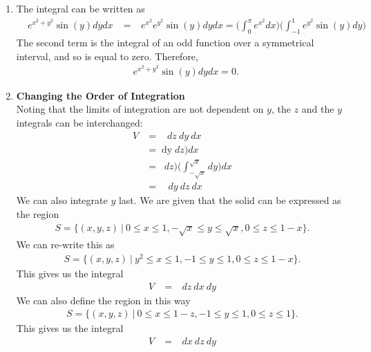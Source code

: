 \documentclass{article}
\begin{document}
\begin{enumerate}
\item %
The integral can be written as
\begin{align*}
  \mathop{\int_0^{\pi} \!\! \int_{-1}^1} e^{x^2 + y^2}\sin(y) dydx 
  &= \mathop{\int_0^{\pi} \!\! \int_{-1}^1} e^{x^2}e^{y^2}\sin(y) dydx  = \Bigg( \int_0^{\pi} e^{x^2} dx \Bigg)\Bigg( \int_{-1}^1 e^{y^2}\sin(y)dy \Bigg)  
\end{align*}
The second term is the integral of an odd function over a symmetrical interval, and so is equal to zero. Therefore,
\begin{align*}
  \mathop{\int_0^{\pi} \!\! \int_{-1}^1} e^{x^2 + y^2}\sin(y) dydx =0.
\end{align*}


\item %
\textbf{Changing the Order of Integration}\\
Noting that the limits of integration are not dependent on $y$, the $z$ and the $y$ integrals can be interchanged:
\begin{align*}
  V &= \mathop{\int_{0}^{1} \!\! \int_{-\sqrt{x}}^{\sqrt{x}} \! \int_0^{1-x} } dz\ dy\ dx \\
   &= \mathop{\int_{0}^{1} \Bigg( \int_{-\sqrt{x}}^{\sqrt{x}} dy \Bigg) \Bigg( \int_0^{1-x} } dz\Bigg) dx \\
   &= \mathop{\int_{0}^{1}  \Bigg( \int_0^{1-x} } dz\Bigg) \Bigg( \int_{-\sqrt{x}}^{\sqrt{x}} dy \Bigg)dx \\
   &= \mathop{\int_{0}^{1} \!\! \int_0^{1-x} \!\! \int_{-\sqrt{x}}^{\sqrt{x}}} dy\ dz\ dx 
\end{align*}
We can also integrate $y$ last. We are given that the solid can be expressed as the region 
\begin{align*}
  S = \{(x,y,z)\ |\  0 \le x \le 1, -\sqrt{x} \le y \le \sqrt{x}, 0 \le z \le 1-x \}.
\end{align*}
We can re-write this as
\begin{align*}
  S = \{(x,y,z)\ |\  y^2 \le x \le 1, -1 \le y \le 1, 0 \le z \le 1-x \}.
\end{align*}
This gives us the integral
\begin{align*}
  V &= \mathop{\int_{-1}^{1} \! \int_{y^2}^{1} \! \int_0^{1-x} } dz\ dx\ dy
\end{align*}
We can also define the region in this way 
\begin{align*}
  S = \{(x,y,z)\ |\  0 \le x \le 1-z, -1 \le y \le 1, 0 \le z \le 1 \}.
\end{align*}
This gives us the integral
\begin{align*}
  V &= \mathop{\int_{-1}^{1} \! \int_{0}^{1} \! \int_0^{1-z} } dx\ dz\ dy
\end{align*}

\end{enumerate}
\end{document}
